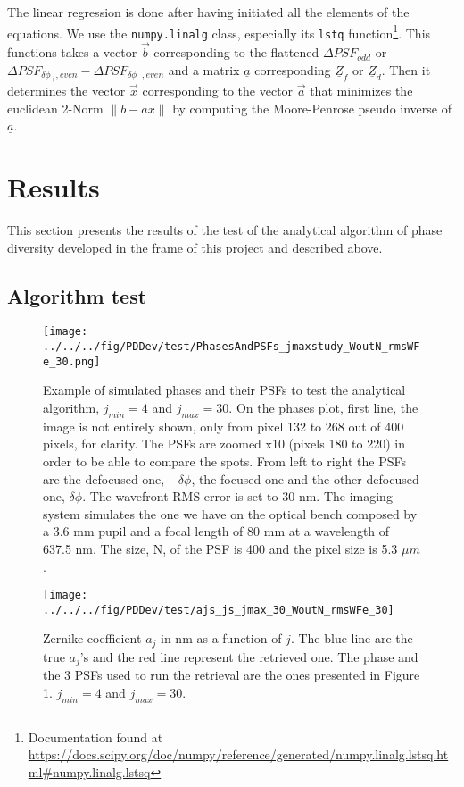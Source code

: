 The linear regression is done after having initiated all the elements of the equations. We use the \verb!numpy.linalg! class, especially its \verb!lstq! function\footnote{Documentation found at \url{https://docs.scipy.org/doc/numpy/reference/generated/numpy.linalg.lstsq.html\#numpy.linalg.lstsq}}. This functions takes a vector $\vec{b}$ corresponding to the flattened $\Delta PSF_{odd}$ or $\Delta PSF_{\delta\phi_+, even}-\Delta PSF_{\delta\phi_-, even}$ and a matrix  $\underline{a}$ corresponding $\underline{Z}_f$ or $\underline{Z}_d$. Then it determines the vector $\vec{x}$ corresponding to the vector $\vec{a}$ that minimizes the euclidean 2-Norm $\lVert b-ax \rVert$ by computing the Moore-Penrose pseudo inverse of $\underline{a}$.

\section{Results}
\label{sec:ourPDresult}

This section presents the results of the test of the analytical algorithm of phase diversity developed in the frame of this project and described above.

\subsection{Algorithm test}

\begin{figure}
\begin{center}
\texttt{[image: ../../../fig/PDDev/test/PhasesAndPSFs\_jmaxstudy\_WoutN\_rmsWFe\_30.png]}
\decoRule
\caption{Example of simulated phases and their PSFs to test the analytical algorithm, $j_{min}=4$ and $j_{max}=30$. On the phases plot, first line, the image is not entirely shown, only from pixel 132 to 268 out of 400 pixels, for clarity. The PSFs are zoomed x10 (pixels 180 to 220) in order to be able to compare the spots. From left to right the PSFs are the defocused one, $-\delta\phi$, the focused one and the other defocused one, $\delta\phi$. The wavefront RMS error is set to 30 nm. The imaging system simulates the one we have on the optical bench composed by a 3.6 mm pupil and a focal length of 80 mm at a wavelength of 637.5 nm. The size, N, of the PSF is 400 and the pixel size is 5.3 $\mu m$.}
\label{fig:simPhasesAndPSFs}
\end{center}
\end{figure}
 

\begin{figure}
\begin{center}
\texttt{[image: ../../../fig/PDDev/test/ajs\_js\_jmax\_30\_WoutN\_rmsWFe\_30]}
\decoRule
\caption{Zernike coefficient $a_j$ in nm as a function of $j$. The blue line are the true $a_j$'s and the red line represent the retrieved one. The phase and the 3 PSFs used to run the retrieval are the ones presented in Figure \ref{fig:simPhasesAndPSFs}. $j_{min}=4$ and $j_{max}=30$.}
\label{fig:ajs_js_jmax_30_WoutN_rmsWFe_30}
\end{center}
\end{figure} 

